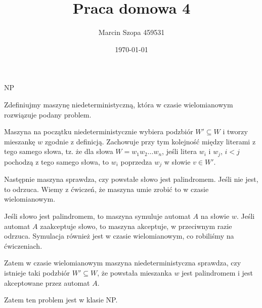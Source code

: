 \documentclass{article}
\title{Praca domowa 4}
\author{Marcin Szopa 459531}
\date{\today}
\theoremstyle{definition}
\theoremstyle{remark}
\begin{document}
\maketitle

\begin{section}{NP}

Zdefiniujmy maszynę niedeterministyczną, która w czasie wielomianowym rozwiązuje podany problem.

Maszyna na początku niedeterministycznie wybiera podzbiór $W' \subseteq W$ i tworzy mieszankę $w$ zgodnie z definicją.
Zachowuje przy tym kolejność między literami z tego samego słowa, tz. że dla słowa $W = w_1 w_2 \ldots w_n$, jeśli litera $w_i$ i $w_j$, $ i < j$ pochodzą z tego samego słowa, to
$w_i$ poprzedza $w_j$ w słowie $v \in W'$.

Następnie maszyna sprawdza, czy powstałe słowo jest palindromem. Jeśli nie jest, to odrzuca. Wiemy z ćwiczeń, że maszyna umie zrobić to w czasie wielomianowym.

Jeśli słowo jest palindromem, to maszyna symuluje automat $A$ na słowie $w$. Jeśli automat $A$ zaakceptuje słowo, to maszyna akceptuje, w przeciwnym razie odrzuca.
Symulacja również jest w czasie wielomianowym, co robiliśmy na ćwiczeniach.

Zatem w czasie wielomianowym maszyna niedeterministyczna sprawdza, czy istnieje taki podzbiór $W' \subseteq W$,
że powstała mieszanka $w$ jest palindromem i jest akceptowane przez automat $A$.

Zatem ten problem jest w klasie NP.

\end{section}
\end{document}
